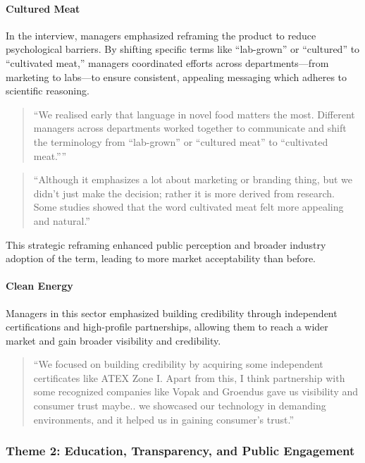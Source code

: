 \paragraph{Cultured Meat}
In the interview, managers emphasized reframing the product to reduce psychological barriers. By shifting specific terms like “lab-grown” or “cultured” to “cultivated meat,” managers coordinated efforts across departments—from marketing to labs—to ensure consistent, appealing messaging which adheres to scientific reasoning.
\begin{quote}
	“We realised early that language in novel food matters the most. Different managers across departments worked together to communicate and shift the terminology from “lab-grown” or “cultured meat” to “cultivated meat.””
\end{quote}
\begin{quote}
	“Although it emphasizes a lot about marketing or branding thing, but we didn’t just make the decision; rather it is more derived from research. Some studies showed that the word cultivated meat felt more appealing and natural.”
\end{quote}
This strategic reframing enhanced public perception and broader industry adoption of the term, leading to more market acceptability than before.

\paragraph{Clean Energy}
Managers in this sector emphasized building credibility through independent certifications and high-profile partnerships, allowing them to reach a wider market and gain broader visibility and credibility.
\begin{quote}
	“We focused on building credibility by acquiring some independent certificates like ATEX Zone I. Apart from this, I think partnership with some recognized companies like Vopak and Groendus gave us visibility and consumer trust maybe.. we showcased our technology in demanding environments, and it helped us in gaining consumer’s trust.”
\end{quote}

\subsubsection*{Theme 2: Education, Transparency, and Public Engagement}

